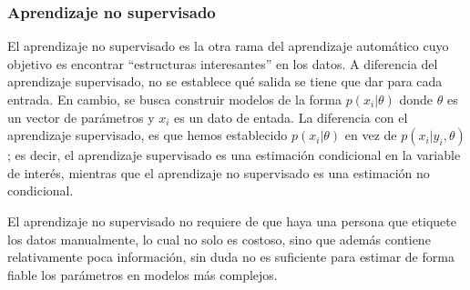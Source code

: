 	
	\subsubsection{Aprendizaje no supervisado}
	
		
		El aprendizaje no supervisado es la otra rama del aprendizaje automático cuyo objetivo es encontrar ``estructuras interesantes'' en los datos. A diferencia del aprendizaje supervisado, no se establece qué salida se tiene que dar para cada entrada. En cambio, se busca construir modelos de la forma $p(x_i | \theta)$ donde $\theta$ es un vector de parámetros y $x_i$ es un dato de entada. La diferencia con el aprendizaje supervisado, es que hemos establecido $p(x_i | \theta)$ en vez de $p(x_i | y_i, \theta)$; es decir, el aprendizaje supervisado es una estimación condicional en la variable de interés, mientras que el aprendizaje no supervisado es una estimación no condicional.
		
		El aprendizaje no supervisado no requiere de que haya una persona que etiquete los datos manualmente, lo cual no solo es costoso, sino que además contiene relativamente poca información, sin duda no es suficiente para estimar de forma fiable los parámetros en modelos más complejos.